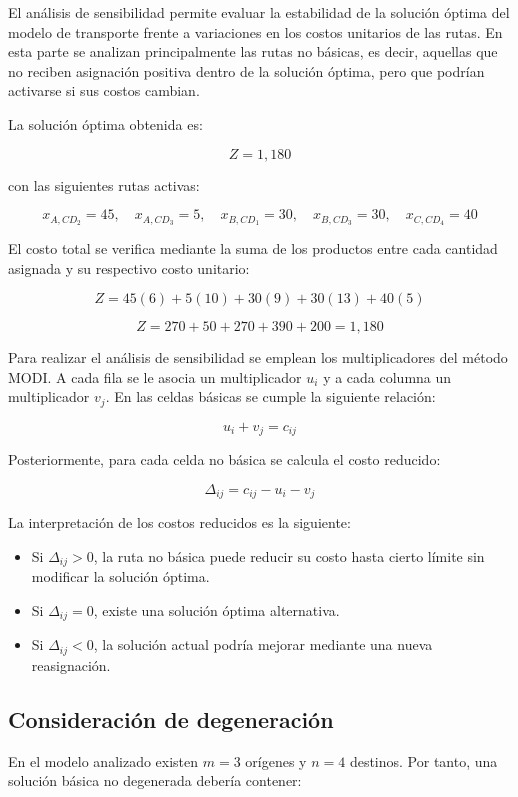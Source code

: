 \documentclass{article}
\begin{document}
	El análisis de sensibilidad permite evaluar la estabilidad de la solución óptima del
	modelo de transporte frente a variaciones en los costos unitarios de las rutas. En esta
	parte se analizan principalmente las rutas no básicas, es decir, aquellas que no reciben
	asignación positiva dentro de la solución óptima, pero que podrían activarse si sus costos
	cambian.
	
	La solución óptima obtenida es:
	
	\[
	Z = 1{,}180
	\]
	
	con las siguientes rutas activas:
	
	\[
	x_{A,CD_2}=45,\quad
	x_{A,CD_3}=5,\quad
	x_{B,CD_1}=30,\quad
	x_{B,CD_3}=30,\quad
	x_{C,CD_4}=40
	\]
	
	El costo total se verifica mediante la suma de los productos entre cada cantidad asignada
	y su respectivo costo unitario:
	
	\[
	Z = 45(6) + 5(10) + 30(9) + 30(13) + 40(5)
	\]
	
	\[
	Z = 270 + 50 + 270 + 390 + 200 = \boxed{1{,}180}
	\]
	
	Para realizar el análisis de sensibilidad se emplean los multiplicadores del método MODI.
	A cada fila se le asocia un multiplicador $u_i$ y a cada columna un multiplicador $v_j$.
	En las celdas básicas se cumple la siguiente relación:
	
	\[
	u_i + v_j = c_{ij}
	\]
	
	Posteriormente, para cada celda no básica se calcula el costo reducido:
	
	\[
	\Delta_{ij} = c_{ij} - u_i - v_j
	\]
	
	La interpretación de los costos reducidos es la siguiente:
	
	\begin{itemize}
		\item Si $\Delta_{ij} > 0$, la ruta no básica puede reducir su costo hasta cierto
		límite sin modificar la solución óptima.
		\item Si $\Delta_{ij} = 0$, existe una solución óptima alternativa.
		\item Si $\Delta_{ij} < 0$, la solución actual podría mejorar mediante una nueva
		reasignación.
	\end{itemize}
	
	\subsection{Consideración de degeneración}
	
	En el modelo analizado existen $m=3$ orígenes y $n=4$ destinos. Por tanto, una solución
	básica no degenerada debería contener:
	
\end{document}
